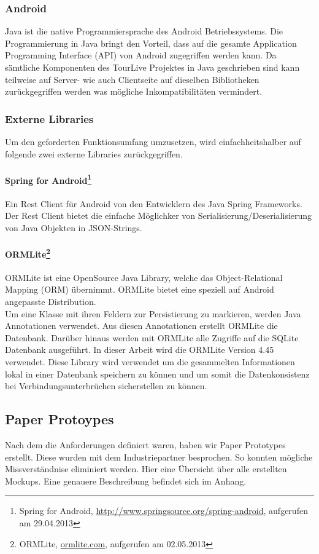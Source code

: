 \subsubsection{Android}
Java ist die native Programmiersprache des Android Betriebssystems. Die Programmierung in Java bringt den Vorteil, dass auf die gesamte Application Programming Interface (API) von Android zugegriffen werden kann. Da sämtliche Komponenten des TourLive Projektes in Java geschrieben sind kann teilweise auf Server- wie auch Clientseite auf dieselben Bibliotheken zurückgegriffen werden was mögliche Inkompatibilitäten vermindert. 

\subsubsection{Externe Libraries}
Um den geforderten Funktionsumfang umzusetzen, wird einfachheitshalber auf folgende zwei externe Libraries zurückgegriffen.
\paragraph{Spring for Android\footnote{Spring for Android, \url{http://www.springsource.org/spring-android}, aufgerufen am 29.04.2013} }
Ein Rest Client für Android von den Entwicklern des Java Spring Frameworks. Der Rest Client bietet die einfache Möglichker von Serialisierung/Deserialisierung von Java Objekten in JSON-Strings. 
\paragraph{ORMLite\footnote{ORMLite, \url{ormlite.com}, aufgerufen am 02.05.2013}} ORMLite ist eine OpenSource Java Library, welche das Object-Relational Mapping
(ORM) übernimmt. ORMLite bietet eine speziell auf Android angepasste Distribution.\\
Um eine Klasse mit ihren Feldern zur Persistierung zu markieren, werden Java Annotationen verwendet. Aus diesen Annotationen erstellt ORMLite die Datenbank. Darüber hinaus werden mit ORMLite alle Zugriffe auf die SQLite Datenbank ausgeführt. In dieser Arbeit wird die ORMLite Version 4.45 verwendet. Diese Library wird verwendet um die gesammelten Informationen lokal in einer Datenbank speichern zu können und um somit die Datenkonsistenz bei Verbindungsunterbrüchen sicherstellen zu können.

\subsection{Paper Protoypes}
Nach dem die Anforderungen definiert waren, haben wir Paper Prototypes erstellt. Diese wurden mit dem Industriepartner besprochen. So konnten mögliche Missverständnise eliminiert werden. Hier eine Übersicht über alle erstellten Mockups. Eine genauere Beschreibung befindet sich im Anhang.

